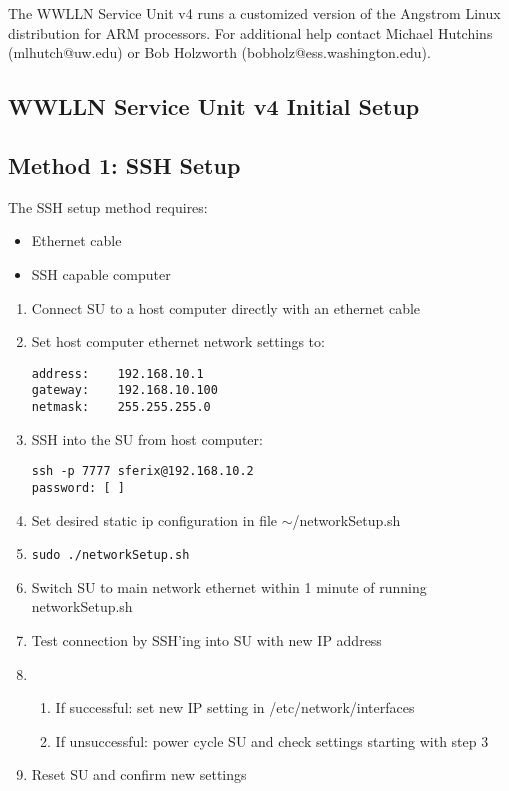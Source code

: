 \documentclass[12pt, letterpaper, onecolumn, oneside]{article}
\begin{document}
The WWLLN Service Unit v4 runs a customized version of the Angstrom Linux distribution for ARM processors.
For additional help contact Michael Hutchins (\mbox{mlhutch@uw.edu}) or Bob Holzworth (\mbox{bobholz@ess.washington.edu}).

\begin{centering}
\section*{WWLLN Service Unit v4 Initial Setup}

\end{centering}

\subsection*{Method 1: SSH Setup}
The SSH setup method requires:
\begin{itemize}
\item{Ethernet cable}
\item{SSH capable computer}
\end{itemize}

\begin{enumerate}
\item{Connect SU to a host computer directly with an ethernet cable}
\item{Set host computer ethernet network settings to:
\begin{verbatim}
address:	192.168.10.1
gateway:	192.168.10.100
netmask:	255.255.255.0
\end{verbatim}}
\item{SSH into the SU from host computer:
\begin{verbatim}
ssh -p 7777 sferix@192.168.10.2
password: [	]
\end{verbatim}}
\item{Set desired static ip configuration in file $\sim$/networkSetup.sh}
\item{\begin{verbatim}
sudo ./networkSetup.sh
\end{verbatim}}
\item{Switch SU to main network ethernet within 1 minute of running networkSetup.sh}
\item{Test connection by SSH'ing into SU with new IP address}
\item{
\begin{enumerate}
\item{If successful: set new IP setting in /etc/network/interfaces}
\item{If unsuccessful: power cycle SU and check settings starting with step 3}
\end{enumerate}}
\item{Reset SU and confirm new settings}
\end{enumerate}
\end{document}
